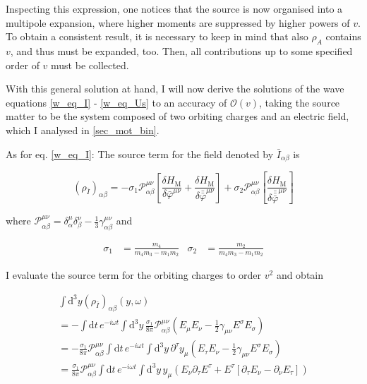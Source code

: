 \documentclass[11pt]{article}
\begin{document}
Inspecting this expression, one notices that the source is now organised into a multipole expansion, where higher moments are suppressed by higher powers of $v$. To obtain a consistent result, it is necessary to keep in mind that also $\rho_A$ contains $v$, and thus must be expanded, too. Then, all contributions up to some specified order of $v$ must be collected.

With this general solution at hand, I will now derive the solutions of the wave equations \ref{w_eq_I} - \ref{w_eq_Us} to an accuracy of $\mathcal{O} \left( v \right)$, taking the source matter to be the system composed of two orbiting charges and an electric field, which I analysed in \ref{sec_mot_bin}. 

As for eq. \ref{w_eq_I}: The source term for the field denoted by $\bar I_{\alpha \beta}$ is

\begin{equation}
	\left( \rho_{\bar I} \right)_{\alpha \beta}
	= -\sigma_{1}
	\mathcal{P}_{\alpha  \beta}^{\mu \nu}
	\left[ 
		\frac{
			\delta H_{\text{M}}
		}{
			\delta \bar{\varphi}^{\mu \nu}
		}
		+
		\frac{
			\delta H_{\text{M}}
		}{
			\delta \bar{\bar{\varphi}}^{\mu \nu}
		}
	\right]
	+ \sigma_2 
	\mathcal{P}_{\alpha  \beta}^{\mu \nu}
	\left[ 
		\frac{
			\delta H_{\text{M}}
		}{
			\delta \bar{\bar{\bar{\varphi}}}^{\mu \nu}
		}
	\right]
\end{equation}


where $\mathcal{P}_{\alpha  \beta}^{\mu \nu} = \delta^\mu_\alpha \delta^\nu_\beta - \frac{1}{3} \gamma_{\alpha \beta}^{\mu \nu}$ and

\begin{align}
	\sigma_1 &= \frac{m_4}{ m_4 m_3  - m_1 m_2} 
	&
	\sigma_2 &= \frac{m_2}{ m_4 m_3  - m_1 m_2}
\end{align}

I evaluate the source term for the orbiting charges to order $v^2$ and obtain

\begin{multline}
		\int \mathrm{d}^3 y \left( \rho_{\bar I} \right)_{\alpha \beta}
		\left( y, \omega \right)\\
		=
		- \int \mathrm{d} t \,e^{-i \omega t}
		\int \mathrm{d}^3 y\,
		\frac{\sigma_1}{8 \pi} \mathcal{P}^{\mu \nu}_{\alpha \beta}
		\left( 
		E_\mu E_\nu - \frac{1}{2} \gamma_{\mu \nu} E^\sigma E_\sigma
		\right)\\
		=
		- \frac{\sigma_1}{8 \pi} \mathcal{P}^{\mu \nu}_{\alpha \beta}
		\int \mathrm{d} t \,e^{-i \omega t}
		\int \mathrm{d}^3 y\,
		\partial^\tau y_\mu
		\left( 
		E_\tau E_\nu - \frac{1}{2} \gamma_{\mu \nu} E^\sigma E_\sigma 
		\right)\\
		=
		\frac{\sigma_1}{8 \pi} \mathcal{P}^{\mu \nu}_{\alpha \beta}
		\int \mathrm{d} t \,e^{-i \omega t}
		\int \mathrm{d}^3 y\,
		y_\mu
		\left(
		E_\nu \partial_\tau E^\tau
		+
		E^\tau \left[
		\partial_\tau E_\nu - \partial_\nu E_\tau
		\right]
		\right)
\end{multline}
\end{document}
